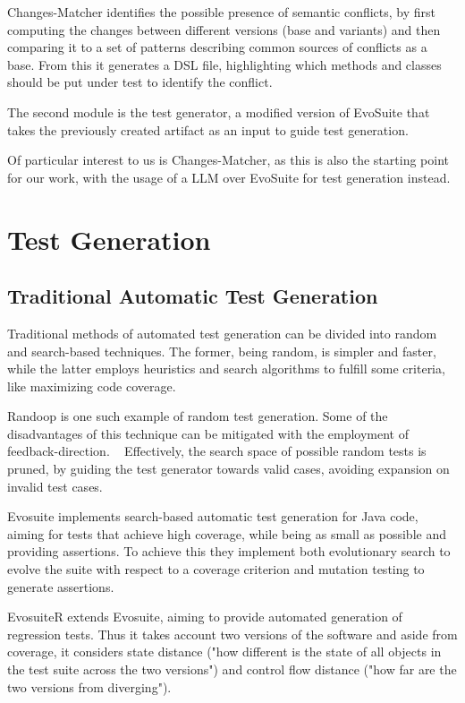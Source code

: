Changes-Matcher identifies the possible presence of semantic conflicts, by first computing the changes between different versions (base and variants) and then comparing it to a set of patterns describing common sources of conflicts as a base. From this it generates a DSL file, highlighting which methods and classes should be put under test to identify the conflict.

The second module is the test generator, a modified version of EvoSuite that takes the previously created artifact as an input to guide test generation.

Of particular interest to us is Changes-Matcher, as this is also the starting point for our work, with the usage of a LLM over EvoSuite for test generation instead.

\section{Test Generation}

\subsection{Traditional Automatic Test Generation}

Traditional methods of automated test generation can be divided into random and search-based techniques. The former, being random, is simpler and faster, while the latter employs heuristics and search algorithms to fulfill some criteria, like maximizing code coverage.

Randoop is one such example of random test generation. Some of the disadvantages of this technique can be mitigated with the employment of feedback-direction. ~\citep{kn:randoop} Effectively, the search space of possible random tests is pruned, by guiding the test generator towards valid cases, avoiding expansion on invalid test cases. ~\citep{kn:randoop}

Evosuite implements search-based automatic test generation for Java code, aiming for tests that achieve high coverage, while being as small as possible and providing assertions. To achieve this they implement both evolutionary search to evolve the suite with respect to a coverage criterion and mutation testing to generate assertions. ~\citep{kn:evosuite}

EvosuiteR extends Evosuite, aiming to provide automated generation of regression tests. Thus it takes account two versions of the software and aside from coverage, it considers state distance ("how different is the state of
all objects in the test suite across the two versions") and control flow distance ("how
far are the two versions from diverging"). ~\citep{kn:evosuiter}


